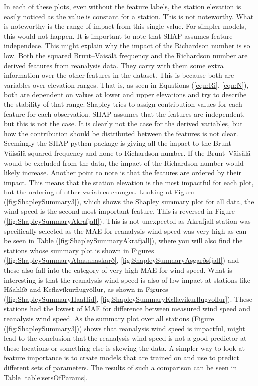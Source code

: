 In each of these plots, even without the feature labels, the station elevation is easily noticed as the value is constant for a station. This is not noteworthy. What is noteworthy is the range of impact from this single value. For simpler models, this would not happen. It is important to note that SHAP assumes feature independece\cite{Salih_2024}. This might explain why the impact of the Richardson number is so low. Both the squared Brunt–Väisälä frequency and the Richardson number are derived features from reanalysis data. They carry with them some extra information over the other features in the dataset. This is because both are variables over elevation ranges. That is, as seen in Equations (\ref{eqn:Ri}, \ref{eqn:N}), both are dependent on values at lower and upper elevations and try to describe the stability of that range. Shapley tries to assign contribution values for each feature for each observation. SHAP assumes that the features are independent, but this is not the case. It is clearly not the case for the derived variables, but how the contribution should be distributed between the features is not clear. Seemingly the SHAP python package is giving all the impact to the Brunt–Väisälä squared frequency and none to Richardson number. If the Brunt–Väisälä would be excluded from the data, the impact of the Richardson number would likely increase. Another point to note is that the features are ordered by their impact. This means that the station elevation is the most impactful for each plot, but the ordering of other variables changes. Looking at Figure (\ref{fig:ShapleySummary3}), which shows the Shapley summary plot for all data, the wind speed is the second most important feature. This is reversed in Figure (\ref{fig:ShapleySummaryAkrafjall}). This is not unexpected as Akrafjall station was specifically selected as the MAE for reanalysis wind speed was very high as can be seen in Table (\ref{fig:ShapleySummaryAkrafjall}), where you will also find the stations whose summary plot is shown in Figures (\ref{fig:ShapleySummaryAlmannaskarð}, \ref{fig:ShapleySummaryAsgarðsfjall}) and these also fall into the category of very high MAE for wind speed. What is interesting is that the reanalysis wind speed is also of low impact at stations like Háahlíð and Keflavíkurflugvöllur, as shown in Figures (\ref{fig:ShapleySummaryHaahlid}, \ref{fig:ShapleySummaryKeflavikurflugvollur}). These stations had the lowest of MAE for difference between measured wind speed and reanalysis wind speed. As the summary plot over all stations (Figure (\ref{fig:ShapleySummary3})) shows that reanalysis wind speed is impactful, might lead to the conclusion that the reanalysis wind speed is not a good predictor at these locations or something else is skewing the data. A simpler way to look at feature importance is to create models that are trained on and use to predict different sets of parameters. The results of such a comparison can be seen in Table \ref{table:setsOfParams}.

